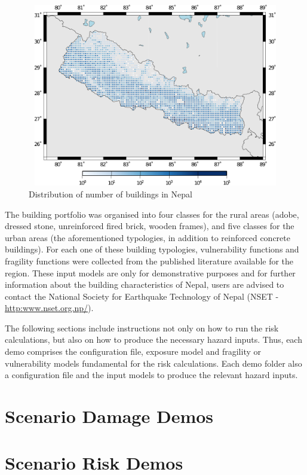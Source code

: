 \begin{figure}[ht]
\centering
\includegraphics[width=12cm,height=8cm]{figures/risk/exposure-nepal.pdf}
\caption{Distribution of number of buildings in Nepal}
\label{fig:exposure-nepal}
\end{figure}

The building portfolio was organised into four classes for the rural areas
(adobe, dressed stone, unreinforced fired brick, wooden frames), and five
classes for the urban areas (the aforementioned typologies, in addition to
reinforced concrete buildings). For each one of these building typologies,
\glspl{vulnerability function} and \glspl{fragility function} were collected
from the published literature available for the region. These input models are
only for demonstrative purposes and for further information about the building
characteristics of Nepal, users are advised to contact the National Society
for Earthquake Technology of Nepal (NSET -
\href{http://www.nset.org.np/}{http:www.nset.org.np/}).

The following sections include instructions not only on how to run the risk
calculations, but also on how to produce the necessary hazard inputs. Thus,
each demo comprises the configuration file, exposure model and fragility or
vulnerability models fundamental for the risk calculations. Each demo folder
also a configuration file and the input models to produce the relevant hazard
inputs.


\section{Scenario Damage Demos}
\label{sec:demos_scenario_damage}


\section{Scenario Risk Demos}
\label{sec:demos_scenario_risk}


